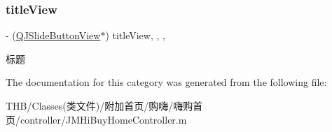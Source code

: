 \subsubsection{\texorpdfstring{title\+View}{titleView}}
{\footnotesize\ttfamily -\/ (\mbox{\hyperlink{interface_q_j_slide_button_view}{Q\+J\+Slide\+Button\+View}}$\ast$) title\+View\hspace{0.3cm}{\ttfamily [read]}, {\ttfamily [write]}, {\ttfamily [nonatomic]}, {\ttfamily [strong]}}

标题 

The documentation for this category was generated from the following file\+:\begin{DoxyCompactItemize}
\item 
T\+H\+B/\+Classes(类文件)/附加首页/购嗨/嗨购首页/controller/J\+M\+Hi\+Buy\+Home\+Controller.\+m\end{DoxyCompactItemize}
